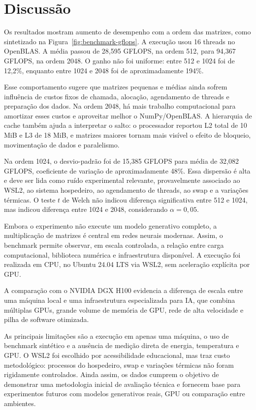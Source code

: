 \section{Discussão}
\label{sec:discussao}

Os resultados mostram aumento de desempenho com a ordem das matrizes, como sintetizado na Figura~\ref{fig:benchmark-gflops}. A execução usou 16 threads no OpenBLAS. A média passou de 28,595 GFLOPS, na ordem 512, para 94,367 GFLOPS, na ordem 2048. O ganho não foi uniforme: entre 512 e 1024 foi de 12,2\%, enquanto entre 1024 e 2048 foi de aproximadamente 194\%.

Esse comportamento sugere que matrizes pequenas e médias ainda sofrem influência de custos fixos de chamada, alocação, agendamento de threads e preparação dos dados. Na ordem 2048, há mais trabalho computacional para amortizar esses custos e aproveitar melhor o NumPy/OpenBLAS. A hierarquia de cache também ajuda a interpretar o salto: o processador reportou L2 total de 10 MiB e L3 de 18 MiB, e matrizes maiores tornam mais visível o efeito de bloqueio, movimentação de dados e paralelismo.

Na ordem 1024, o desvio-padrão foi de 15,385 GFLOPS para média de 32,082 GFLOPS, coeficiente de variação de aproximadamente 48\%. Essa dispersão é alta e deve ser lida como ruído experimental relevante, provavelmente associado ao WSL2, ao sistema hospedeiro, ao agendamento de threads, ao swap e a variações térmicas. O teste $t$ de Welch não indicou diferença significativa entre 512 e 1024, mas indicou diferença entre 1024 e 2048, considerando $\alpha=0{,}05$.

Embora o experimento não execute um modelo generativo completo, a multiplicação de matrizes é central em redes neurais modernas. Assim, o benchmark permite observar, em escala controlada, a relação entre carga computacional, biblioteca numérica e infraestrutura disponível. A execução foi realizada em CPU, no Ubuntu 24.04 LTS via WSL2, sem aceleração explícita por GPU.

A comparação com o NVIDIA DGX H100 evidencia a diferença de escala entre uma máquina local e uma infraestrutura especializada para IA, que combina múltiplas GPUs, grande volume de memória de GPU, rede de alta velocidade e pilha de software otimizada.

As principais limitações são a execução em apenas uma máquina, o uso de benchmark sintético e a ausência de medição direta de energia, temperatura e GPU. O WSL2 foi escolhido por acessibilidade educacional, mas traz custo metodológico: processos do hospedeiro, swap e variações térmicas não foram rigidamente controlados. Ainda assim, os dados cumprem o objetivo de demonstrar uma metodologia inicial de avaliação técnica e fornecem base para experimentos futuros com modelos generativos reais, GPU ou comparação entre ambientes.
